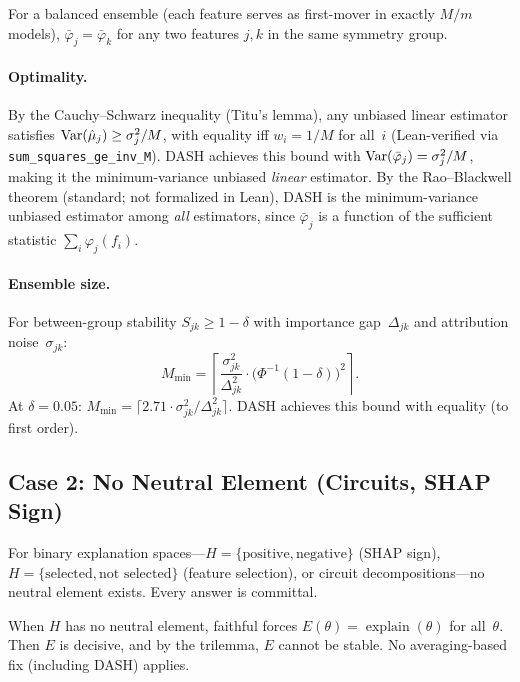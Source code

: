 \begin{corollary}
\label{cor:equity}
For a balanced ensemble (each feature serves as first-mover in exactly $M/m$ models), $\bar{\varphi}_j = \bar{\varphi}_k$ for any two features $j, k$ in the same symmetry group.
\end{corollary}

\paragraph{Optimality.}
By the Cauchy--Schwarz inequality (Titu's lemma), any unbiased linear estimator satisfies $\operatorname{Var}(\hat{\mu}_j) \geq \sigma_j^2/M$, with equality iff $w_i = 1/M$ for all~$i$ (Lean-verified via \texttt{sum\_squares\_ge\_inv\_M}). DASH achieves this bound with $\operatorname{Var}(\bar{\varphi}_j) = \sigma_j^2/M$, making it the minimum-variance unbiased \emph{linear} estimator. By the Rao--Blackwell theorem (standard; not formalized in Lean), DASH is the minimum-variance unbiased estimator among \emph{all} estimators, since $\bar{\varphi}_j$ is a function of the sufficient statistic $\sum_i \varphi_j(f_i)$.

\paragraph{Ensemble size.}
For between-group stability $S_{jk} \geq 1 - \delta$ with importance gap~$\Delta_{jk}$ and attribution noise~$\sigma_{jk}$:
\begin{equation}
\label{eq:ensemble-size}
M_{\min} = \left\lceil \frac{\sigma_{jk}^2}{\Delta_{jk}^2} \cdot \bigl(\Phi^{-1}(1-\delta)\bigr)^2 \right\rceil.
\end{equation}
At $\delta = 0.05$: $M_{\min} = \lceil 2.71 \cdot \sigma_{jk}^2 / \Delta_{jk}^2 \rceil$. DASH achieves this bound with equality (to first order).

\subsection{Case 2: No Neutral Element (Circuits, SHAP Sign)}

For binary explanation spaces---$H = \{\text{positive}, \text{negative}\}$ (SHAP sign), $H = \{\text{selected}, \text{not selected}\}$ (feature selection), or circuit decompositions---no neutral element exists. Every answer is committal.

\begin{theorem}
\label{thm:no-averaging}
When $H$ has no neutral element, faithful forces $E(\theta) = \operatorname{explain}(\theta)$ for all~$\theta$. Then $E$ is decisive, and by the trilemma, $E$ cannot be stable. No averaging-based fix (including DASH) applies.
\end{theorem}

